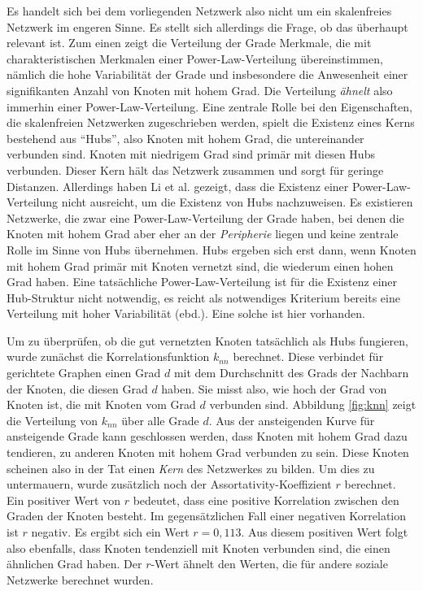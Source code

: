Es handelt sich bei dem vorliegenden Netzwerk also nicht um ein
skalenfreies Netzwerk im engeren Sinne. Es stellt sich allerdings die
Frage, ob das überhaupt relevant ist. Zum einen zeigt die Verteilung
der Grade Merkmale, die mit charakteristischen Merkmalen einer
Power-Law-Verteilung übereinstimmen, nämlich die hohe
Variabilität der Grade und insbesondere die Anwesenheit einer
signifikanten Anzahl von Knoten mit hohem Grad. Die Verteilung
\emph{ähnelt} also immerhin einer Power-Law-Verteilung. Eine
zentrale Rolle bei den Eigenschaften, die skalenfreien Netzwerken
zugeschrieben werden, spielt die Existenz eines Kerns bestehend aus
``Hubs'', also Knoten mit hohem Grad, die untereinander verbunden
sind. Knoten mit niedrigem Grad sind primär mit diesen Hubs
verbunden. Dieser Kern hält das Netzwerk zusammen und sorgt für
geringe Distanzen. Allerdings haben Li et al. \cite{Li2005} gezeigt,
dass die Existenz einer Power-Law-Verteilung nicht ausreicht, um die
Existenz von Hubs nachzuweisen. Es existieren Netzwerke, die zwar eine
Power-Law-Verteilung der Grade haben, bei denen die Knoten mit hohem
Grad aber eher an der \emph{Peripherie} liegen und keine zentrale
Rolle im Sinne von Hubs übernehmen.  Hubs ergeben sich erst dann,
wenn Knoten mit hohem Grad primär mit Knoten vernetzt sind, die
wiederum einen hohen Grad haben. Eine tatsächliche
Power-Law-Verteilung ist für die Existenz einer Hub-Struktur nicht
notwendig, es reicht als notwendiges Kriterium bereits eine Verteilung
mit hoher Variabilität (ebd.). Eine solche ist hier vorhanden.

Um zu überprüfen, ob die gut vernetzten Knoten tatsächlich als
Hubs fungieren, wurde zunächst die Korrelationsfunktion $k_{nn}$
berechnet. Diese verbindet für gerichtete Graphen einen Grad $d$ mit
dem Durchschnitt des Grads der Nachbarn der Knoten, die diesen Grad
$d$ haben. Sie misst also, wie hoch der Grad von Knoten ist, die mit
Knoten vom Grad $d$ verbunden sind. Abbildung \ref{fig:knn} zeigt die
Verteilung von $k_{nn}$ über alle Grade $d$. Aus der ansteigenden
Kurve für ansteigende Grade kann geschlossen werden, dass Knoten mit
hohem Grad dazu tendieren, zu anderen Knoten mit hohem Grad verbunden
zu sein. Diese Knoten scheinen also in der Tat einen \emph{Kern} des
Netzwerkes zu bilden. Um dies zu untermauern, wurde zusätzlich noch
der Assortativity-Koeffizient $r$ \cite{PhysRevLett.89.208701}
berechnet. Ein positiver Wert von $r$ bedeutet, dass eine positive
Korrelation zwischen den Graden der Knoten besteht. Im
gegensätzlichen Fall einer negativen Korrelation ist $r$ negativ. Es
ergibt sich ein Wert $r = 0,113$. Aus diesem positiven Wert folgt also
ebenfalls, dass Knoten tendenziell mit Knoten verbunden sind, die
einen ähnlichen Grad haben. Der $r$-Wert ähnelt den Werten, die
für andere soziale Netzwerke berechnet wurden\cite{newman:167}.

